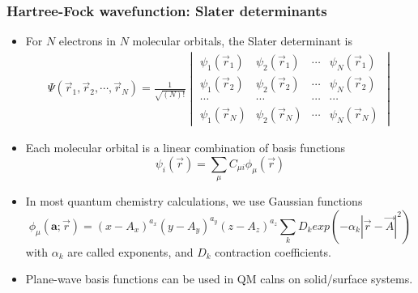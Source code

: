 \documentclass[handout]{beamer} %
\begin{document}
\begin{frame}
\frametitle{Hartree-Fock wavefunction: Slater determinants}
\begin{itemize} \itemsep 1mm
\item  \small{For $N$ electrons in $N$ molecular orbitals, the Slater determinant is }
\footnotesize{
\begin{eqnarray*}
\Psi(\vec{r}_1, \vec{r}_2, \cdots, \vec{r}_N)  = \frac{1}{\sqrt{(N)!}} 
\begin{vmatrix} 
   \psi_{1} (\vec{r}_1)  &  \psi_{2} (\vec{r}_1)  & \cdots &    \psi_{N} (\vec{r}_1) \\
  \psi_{1} (\vec{r}_2)  &  \psi_{2} (\vec{r}_2)  & \cdots &    \psi_{N} (\vec{r}_2) \\
   \cdots & \cdots & \cdots & \cdots \\   
   \psi_{1} (\vec{r}_N)  &  \psi_{2} (\vec{r}_N)  & \cdots &    \psi_{N} (\vec{r}_N)
\end{vmatrix} 
\end{eqnarray*}  
}  
\item Each molecular orbital is a linear combination of basis functions
\begin{equation*}
\psi_i(\vec{r}) = \sum_{\mu} C_{\mu i} \phi_{\mu} ({\vec{r}}) 
\end{equation*} 
\item In most quantum chemistry calculations, we use Gaussian functions
\begin{equation*}
\phi_{\mu} ( \mathbf{a}; \vec{r}) = (x-A_x)^{a_x} (y-A_y)^{a_y} (z-A_z)^{a_z} \sum_k D_k exp\left(-\alpha_k |\vec{r} - \vec{A} | ^2 \right) 
\end{equation*}
with $\alpha_k$ are called exponents, and $D_k$ contraction coefficients. 
\item Plane-wave basis functions can be used in QM calns on solid/surface systems. 
\end{itemize}
\end{frame}
\end{document}
